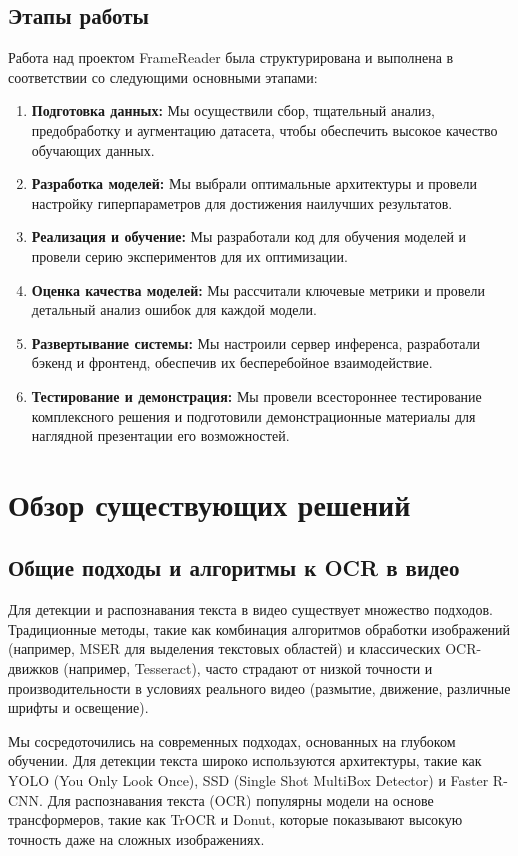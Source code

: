 \documentclass[12pt, a4paper]{article}
\theoremstyle{definition}
\theoremstyle{remark}
\begin{document}
	\subsection{Этапы работы}
	Работа над проектом FrameReader была структурирована и выполнена в соответствии со следующими основными этапами:
	\begin{enumerate}
		\item \textbf{Подготовка данных:} Мы осуществили сбор, тщательный анализ, предобработку и аугментацию датасета, чтобы обеспечить высокое качество обучающих данных.
		\item \textbf{Разработка моделей:} Мы выбрали оптимальные архитектуры и провели настройку гиперпараметров для достижения наилучших результатов.
		\item \textbf{Реализация и обучение:} Мы разработали код для обучения моделей и провели серию экспериментов для их оптимизации.
		\item \textbf{Оценка качества моделей:} Мы рассчитали ключевые метрики и провели детальный анализ ошибок для каждой модели.
		\item \textbf{Развертывание системы:} Мы настроили сервер инференса, разработали бэкенд и фронтенд, обеспечив их бесперебойное взаимодействие.
		\item \textbf{Тестирование и демонстрация:} Мы провели всестороннее тестирование комплексного решения и подготовили демонстрационные материалы для наглядной презентации его возможностей.
	\end{enumerate}
	
	\section{Обзор существующих решений}
	\subsection{Общие подходы и алгоритмы к OCR в видео}
	Для детекции и распознавания текста в видео существует множество подходов. Традиционные методы, такие как комбинация алгоритмов обработки изображений (например, MSER для выделения текстовых областей) и классических OCR-движков (например, Tesseract), часто страдают от низкой точности и производительности в условиях реального видео (размытие, движение, различные шрифты и освещение).
	
	Мы сосредоточились на современных подходах, основанных на глубоком обучении. Для детекции текста широко используются архитектуры, такие как YOLO (You Only Look Once), SSD (Single Shot MultiBox Detector) и Faster R-CNN. Для распознавания текста (OCR) популярны модели на основе трансформеров, такие как TrOCR и Donut, которые показывают высокую точность даже на сложных изображениях.
	
\end{document}
